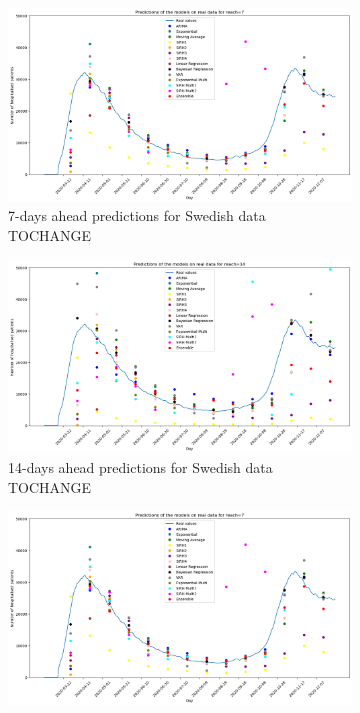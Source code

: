 \begin{figure}[h!]
    \centering
    \begin{subfigure}[b]{0.5\textwidth}
        \centering
        \includegraphics[width=\textwidth]{figures/real_data_France_7.png}  
        \caption{7-days ahead predictions for Swedish data TOCHANGE}
        \label{fig:sousfig1g}
      \end{subfigure}
      \hfill
      \begin{subfigure}[b]{0.5\textwidth}
        \centering
        \includegraphics[width=\textwidth]{figures/real_data_France_14.png}  
        \caption{14-days ahead predictions for Swedish data TOCHANGE}
        \label{fig:sousfig2g}
      \end{subfigure}
      \begin{subfigure}[b]{0.5\textwidth}
        \centering
        \includegraphics[width=\textwidth]{figures/real_data_France_7.png}  

\end{subfigure}
\end{figure}

